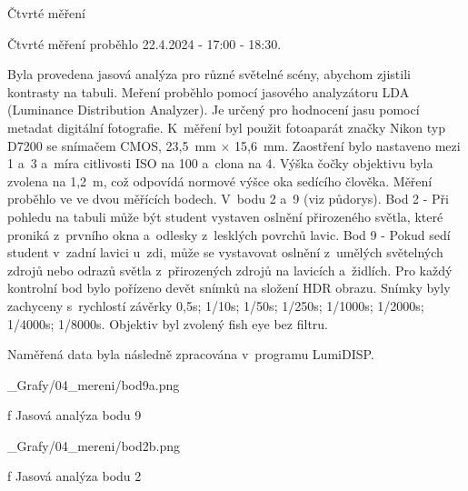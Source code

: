\sec Čtvrté měření

Čtvrté měření proběhlo 22.4.2024 - 17:00 - 18:30.

Byla provedena jasová analýza pro různé světelné scény, abychom zjistili kontrasty na tabuli.
Meření proběhlo pomocí jasového analyzátoru LDA (Luminance Distribution Analyzer). Je určený pro hodnocení
jasu pomocí metadat digitální fotografie.
\medskip
K~měření byl použit fotoaparát značky Nikon typ D7200 se snímačem CMOS, 23,5~mm $\times$ 15,6~mm.
Zaostření bylo nastaveno mezi 1 a~3 a~míra citlivosti ISO na 100 a~clona na 4. Výška čočky
objektivu byla zvolena na 1,2~m, což odpovídá normové výšce oka sedícího člověka.
\medskip
Měření proběhlo ve ve dvou měřících bodech. V~bodu 2 a~9 (viz půdorys).
\medskip
Bod 2 - Při pohledu na tabuli může být student vystaven oslnění přirozeného světla, které proniká z~prvního
okna a~odlesky z~lesklých povrchů lavic.
\medskip
Bod 9 -  Pokud sedí student v~zadní lavici u~zdi, může se vystavovat oslnění z~umělých světelných zdrojů nebo
odrazů světla z~přirozených zdrojů na lavicích a~židlích.
\medskip
Pro každý kontrolní bod bylo pořízeno devět snímků na složení HDR obrazu. Snímky
byly zachyceny s~rychlostí závěrky 0,5s; 1/10s; 1/50s; 1/250s; 1/1000s; 1/2000s; 1/4000s; 1/8000s. Objektiv byl
zvolený fish eye bez filtru.

Naměřená data byla následně zpracována v~programu LumiDISP.

\medskip
\medskip {}
\picw=14cm _Grafy/04_mereni/bod9a.png
\caption/f Jasová analýza bodu 9
\medskip

\medskip
\medskip {}
\picw=14cm _Grafy/04_mereni/bod2b.png
\caption/f Jasová analýza bodu 2
\medskip
\medskip






